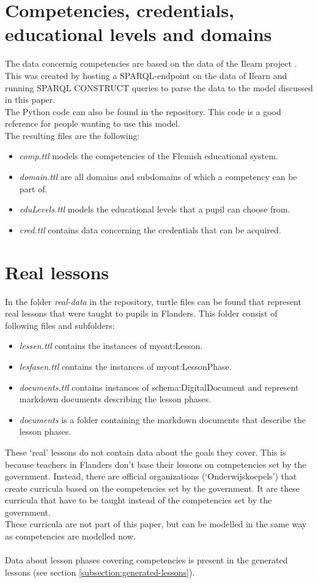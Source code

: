 \documentclass[a4paper]{report}
\begin{document}
    \section{Competencies, credentials, educational levels and domains}
    \label{subsection:comp}
    The data concernig competencies are based on the data of the Ilearn project \cite{ilearnskosmos}.
    This was created by hosting a SPARQL-endpoint on the data of Ilearn and running SPARQL CONSTRUCT queries to parse the data to the model discussed in this paper.\\
    The Python code can also be found in the repository. This code is a good reference for people wanting to use this model.\\
    The resulting files are the following:
    \begin{itemize}
        \item \emph{comp.ttl} models the competencies of the Flemish educational system.
        \item \emph{domain.ttl} are all domains and subdomains of which a competency can be part of.
        \item \emph{eduLevels.ttl} models the educational levels that a pupil can choose from.
        \item \emph{cred.ttl} contains data concerning the credentials that can be acquired.
    \end{itemize}

    \section{Real lessons}
    In the folder \emph{real-data} in the repository, turtle files can be found that represent real lessons that were taught to pupils in Flanders.
    This folder consist of following files and subfolders:
    \begin{itemize}
        \item \emph{lessen.ttl} contains the instances of myont:Lesson.
        \item \emph{lesfasen.ttl} contains the instances of myont:LessonPhase.
        \item \emph{documents.ttl} contains instances of schema:DigitalDocument and represent markdown documents describing the lesson phases.
        \item \emph{documents} is a folder containing the markdown documents that describe the lesson phases.
    \end{itemize}
    These `real' lessons do not contain data about the goals they cover.
    This is because teachers in Flanders don't base their lessons on competencies set by the government.
    Instead, there are official organizations (`Onderwijskoepels') that create curricula based on the competencies set by the government.
    It are these curricula that have to be taught instead of the competencies set by the government.\\
    These curricula are not part of this paper, but can be modelled in the same way as competencies are modelled now.\\ \\
    Data about lesson phases covering competencies is present in the generated lessons (see section \ref{subsection:generated-lessons}).
\end{document}
